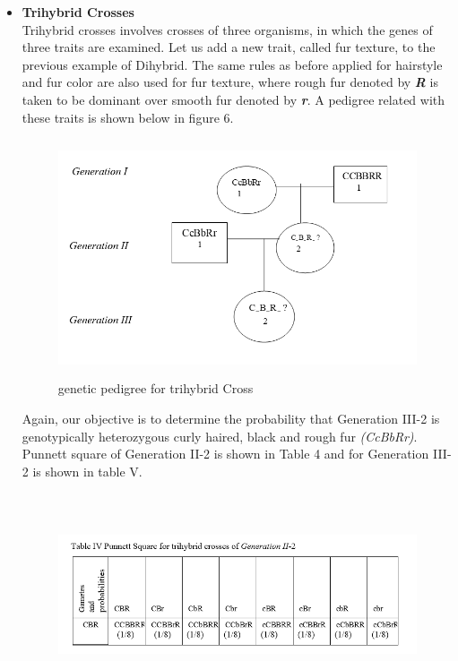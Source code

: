 \documentclass{article}
\begin{document}
\begin{itemize}
  \item \textbf{Trihybrid Crosses}\\
   Trihybrid crosses involves crosses of three organisms, in which the genes of three traits are examined. Let us add a new trait, called fur texture, to the previous example of Dihybrid. The same rules as before applied for hairstyle and fur color are also used for fur texture, where rough fur denoted by \textbf{\textit{R}} is taken to be dominant over smooth fur denoted by \textbf{\textit{r}}. A pedigree related with these traits is shown below in figure 6.
   \begin{figure}[h]
   	\centering
   	\includegraphics[height=7cm,width=11cm]{trihybrid_pedigree}
   	\caption{genetic pedigree for trihybrid Cross}
   \end{figure}
Again, our objective is to determine the probability that Generation III-2 is genotypically heterozygous curly haired, black and rough fur \textit{(CcBbRr)}. Punnett square of Generation II-2 is shown in Table 4 and for Generation III-2 is shown in table V.
\begin{figure}
	\includegraphics[height=6cm,width=18cm]{table4}\\

\end{figure}
\end{itemize}
\end{document}
